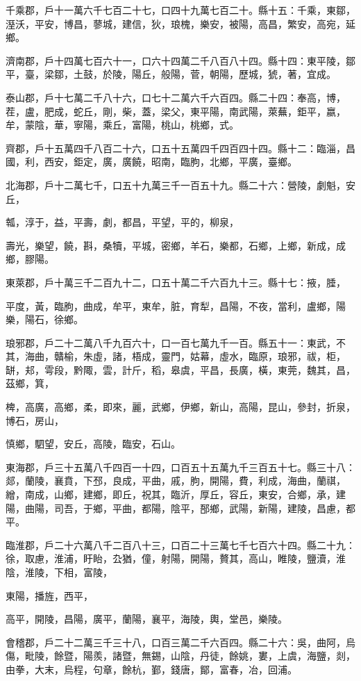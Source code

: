 \begin{pinyinscope}
千乘郡，戶十一萬六千七百二十七，口四十九萬七百二十。縣十五：千乘，東鄒，溼沃，平安，博昌，蓼城，建信，狄，琅槐，樂安，被陽，高昌，繁安，高宛，延鄉。

濟南郡，戶十四萬七百六十一，口六十四萬二千八百八十四。縣十四：東平陵，鄒平，臺，梁鄒，土鼓，於陵，陽丘，般陽，菅，朝陽，歷城，猇，著，宜成。

泰山郡，戶十七萬二千八十六，口七十二萬六千六百四。縣二十四：奉高，博，茬，盧，肥成，蛇丘，剛，柴，蓋，梁父，東平陽，南武陽，萊蕪，鉅平，嬴，牟，蒙陰，華，寧陽，乘丘，富陽，桃山，桃鄉，式。

齊郡，戶十五萬四千八百二十六，口五十五萬四千四百四十四。縣十二：臨淄，昌國，利，西安，鉅定，廣，廣饒，昭南，臨朐，北鄉，平廣，臺鄉。

北海郡，戶十二萬七千，口五十九萬三千一百五十九。縣二十六：營陵，劇魁，安丘，

瓡，淳于，益，平壽，劇，都昌，平望，平的，柳泉，

壽光，樂望，饒，斟，桑犢，平城，密鄉，羊石，樂都，石鄉，上鄉，新成，成鄉，膠陽。

東萊郡，戶十萬三千二百九十二，口五十萬二千六百九十三。縣十七：掖，腄，

平度，黃，臨朐，曲成，牟平，東牟，脏，育犁，昌陽，不夜，當利，盧鄉，陽樂，陽石，徐鄉。

琅邪郡，戶二十二萬八千九百六十，口一百七萬九千一百。縣五十一：東武，不其，海曲，贛榆，朱虛，諸，梧成，靈門，姑幕，虛水，臨原，琅邪，祓，柜，缾，邞，雩段，黔陬，雲，計斤，稻，皋虞，平昌，長廣，橫，東莞，魏其，昌，茲鄉，箕，

椑，高廣，高鄉，柔，即來，麗，武鄉，伊鄉，新山，高陽，昆山，參封，折泉，博石，房山，

慎鄉，駟望，安丘，高陵，臨安，石山。

東海郡，戶三十五萬八千四百一十四，口百五十五萬九千三百五十七。縣三十八：郯，蘭陵，襄賁，下邳，良成，平曲，戚，朐，開陽，費，利成，海曲，蘭祺，繒，南成，山鄉，建鄉，即丘，祝其，臨沂，厚丘，容丘，東安，合鄉，承，建陽，曲陽，司吾，于鄉，平曲，都陽，陰平，郚鄉，武陽，新陽，建陵，昌慮，都平。

臨淮郡，戶二十六萬八千二百八十三，口百二十三萬七千七百六十四。縣二十九：徐，取慮，淮浦，盱眙，厹猶，僮，射陽，開陽，贅其，高山，睢陵，鹽瀆，淮陰，淮陵，下相，富陵，

東陽，播旌，西平，

高平，開陵，昌陽，廣平，蘭陽，襄平，海陵，輿，堂邑，樂陵。

會稽郡，戶二十二萬三千三十八，口百三萬二千六百四。縣二十六：吳，曲阿，烏傷，毗陵，餘暨，陽羨，諸暨，無錫，山陰，丹徒，餘姚，婁，上虞，海鹽，剡，由拳，大末，烏程，句章，餘杭，鄞，錢唐，鄮，富春，冶，回浦。


\end{pinyinscope}
